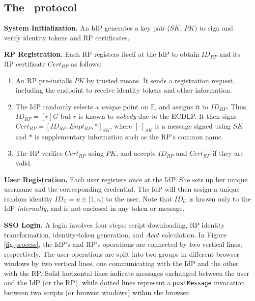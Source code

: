 \subsection{The \usso\ protocol}
\label{implementations}

\noindent \textbf{System Initialization.}
An IdP generates a key pair ($SK$, $PK$) to sign and verify identity tokens and RP certificates.

\vspace{1.5mm}
\noindent\textbf{RP Registration.}
Each RP registers itself at the IdP to obtain $ID_{RP}$ and its RP certificate $Cert_{RP}$ as follows:
\vspace{-\topsep}\begin{enumerate}
\setlength{\topsep}{0pt}
\setlength{\partopsep}{0pt}
\setlength{\itemsep}{0pt}
\setlength{\parsep}{0pt}
\setlength{\parskip}{0pt}
\item
An RP pre-installs $PK$ by trusted means.
It sends a registration request, including the endpoint to receive identity tokens and other information.
\item
The IdP randomly selects a \emph{unique} point on $\mathbb{E}$,
        and assigns it to $ID_{RP}$.
Thus, $ID_{RP} = [r]G$ but $r$ is known to \emph{nobody} due to the ECDLP.
It then signs $Cert_{RP} = [ID_{RP}, Enpt_{RP}, *]_{SK}$,
     where $[\cdot]_{SK}$ is a message signed using $SK$ and $*$ is supplementary information such as the RP's common name.
\item
The RP verifies $Cert_{RP}$ using $PK$, and accepts $ID_{RP}$ and $Cert_{RP}$ if they are valid.
\end{enumerate}


\noindent\textbf{User Registration.}
Each user registers once at the IdP. She sets up her unique username and the corresponding credential.
The IdP will then assign
a unique random identity $ID_U = u \in [1, n)$ to the user.
Note that $ID_U$ is known only to the IdP \emph{internally},
 and is not enclosed in any token or message.


\vspace{1.5mm}
\noindent\textbf{SSO Login.} A login %
involves four steps: script downloading, RP identity transformation, identity-token generation, and $Acct$ calculation. In Figure \ref{fig:process}, the IdP's and RP's operations are connected by two vertical lines, respectively. The user operations are split into two groups in different browser windows by two vertical lines, one communicating with the IdP and the other with the RP. Solid horizontal lines indicate messages exchanged between the user and the IdP (or the RP), while dotted lines represent a \verb+postMessage+ invocation between two scripts (or browser windows) within the browser.


